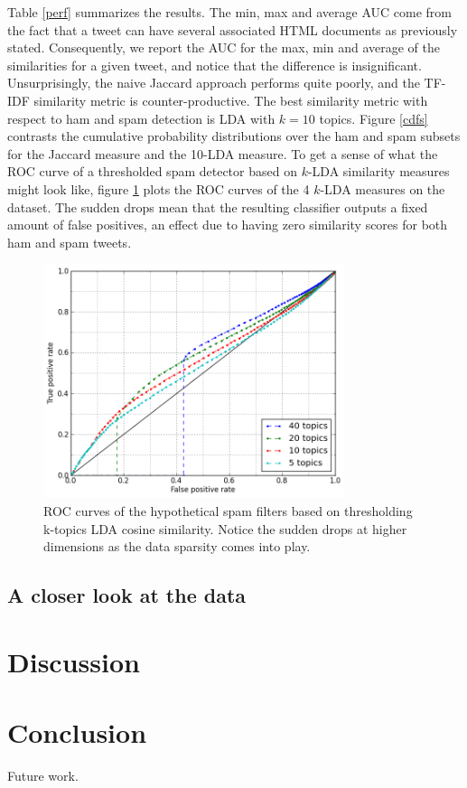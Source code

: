 \documentclass[times, 11pt, twocolumn]{article}
\begin{document}
Table \ref{perf} summarizes the results. The min, max and average AUC come from the fact that a tweet can
have several associated HTML documents as previously stated. Consequently, we report the AUC for the
max, min and average of the similarities for a given tweet, and notice that the difference is insignificant. 
Unsurprisingly, the naive Jaccard approach performs quite poorly, and the TF-IDF similarity 
metric is counter-productive. The best similarity metric with respect to ham and spam detection is 
LDA with $k=10$ topics. Figure \ref{cdfs} contrasts the cumulative 
probability distributions over the ham and spam subsets for the Jaccard measure and the 10-LDA measure. To get
a sense of what the ROC curve of a thresholded spam detector based on $k$-LDA similarity measures might look like,
figure \ref{roc} plots the ROC curves of the 4 $k$-LDA measures on the dataset. The sudden drops mean that the
resulting classifier outputs a fixed amount of false positives, an effect due to having zero similarity scores 
for both ham and spam tweets.

\begin{figure}[ht]\centering
	\includegraphics[width=8.8cm]{roc_lda_sim.png}
	\caption{ROC curves of the hypothetical spam filters based on thresholding k-topics LDA cosine
	similarity. Notice the sudden drops at higher dimensions as the data sparsity comes into play.}
	\label{roc}
\end{figure}

\subsection{A closer look at the data}

\section{Discussion}


\section{Conclusion}
Future work.



\end{document}
